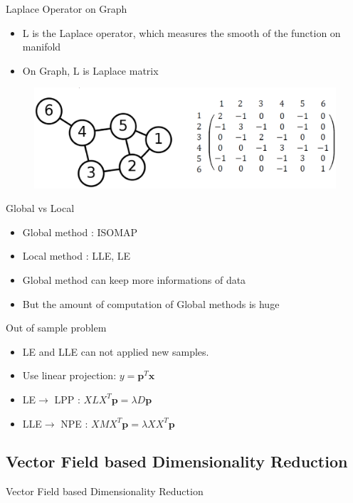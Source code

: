 \documentclass{beamer}
\newcommand{\bol}[1]{\textbf{#1}}
\begin{document}
\begin{darkframes}
    \begin{frame}{Laplace Operator on Graph}
    \begin{itemize}
    	\item L is the Laplace operator, which measures the smooth of the function on manifold
    	\item On Graph, L is Laplace matrix
    \end{itemize}
    \begin{figure}
    \centering
    \includegraphics[scale=0.2]{./figs/fig9.eps}
    \end{figure}
    \end{frame}
    
    
    
	\begin{frame}{Global vs Local}
	\begin{itemize}
		\item Global method : ISOMAP
		\item Local method : LLE, LE
		\item Global method can keep more informations of data
		\item But the amount of computation of Global methods is huge
	\end{itemize}
	\end{frame}	    
    
    \begin{frame}{Out of sample problem}
    \begin{itemize}
    	\item LE and LLE can not applied new samples. 
    	\item Use linear projection: $y = \bol{p}^T\bol{x}$
    	\item LE$\rightarrow$ LPP : $XLX^T\bol{p} = \lambda D\bol{p}$
    	\item LLE$\rightarrow$ NPE : $XMX^T\bol{p} = \lambda XX^T\bol{p}$
    \end{itemize}
    
    \end{frame}
    
   \subsection{Vector Field based Dimensionality Reduction}
   \begin{frame}{Vector Field based Dimensionality Reduction}
   

\end{frame}
\end{darkframes}
\end{document}
